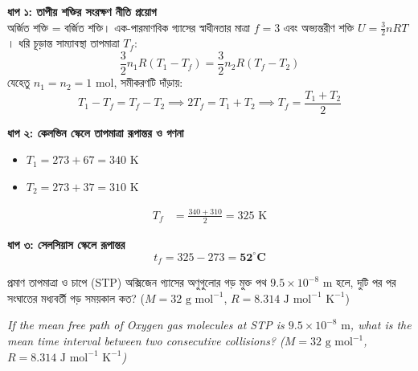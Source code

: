 \documentclass[12pt, a4paper]{article}
\begin{document}
\begin{tcolorbox}[solutionbox={সমাধান (Solution)}]
    \noindent
    \textbf{ধাপ ১: তাপীয় শক্তির সংরক্ষণ নীতি প্রয়োগ} \\
    অর্জিত শক্তি = বর্জিত শক্তি। এক-পারমাণবিক গ্যাসের স্বাধীনতার মাত্রা $f = 3$ এবং অভ্যন্তরীণ শক্তি $U = \frac{3}{2} n R T$। ধরি চূড়ান্ত সাম্যাবস্থা তাপমাত্রা $T_f$:
    \[ \frac{3}{2} n_1 R (T_1 - T_f) = \frac{3}{2} n_2 R (T_f - T_2) \]
    যেহেতু $n_1 = n_2 = 1\text{ mol}$, সমীকরণটি দাঁড়ায়:
    \[ T_1 - T_f = T_f - T_2 \implies 2 T_f = T_1 + T_2 \implies T_f = \frac{T_1 + T_2}{2} \]
    
    \vspace{0.4em}
    \noindent\textbf{ধাপ ২: কেলভিন স্কেলে তাপমাত্রা রূপান্তর ও গণনা}
    \begin{itemize}[leftmargin=1.5em, itemsep=0.2em]
        \item $T_1 = 273 + 67 = 340\text{ K}$
        \item $T_2 = 273 + 37 = 310\text{ K}$
    \end{itemize}
    \begin{align*}
        T_f &= \frac{340 + 310}{2} = 325\text{ K}
    \end{align*}
    
    \vspace{0.4em}
    \noindent\textbf{ধাপ ৩: সেলসিয়াস স্কেলে রূপান্তর}
    \[ t_f = 325 - 273 = \mathbf{52^\circ\text{C}} \]
\end{tcolorbox}

\vspace{2em}

\begin{tcolorbox}[questionbox={প্রশ্ন (Question) 20}]
    \noindent
    প্রমাণ তাপমাত্রা ও চাপে (STP) অক্সিজেন গ্যাসের অণুগুলোর গড় মুক্ত পথ $9.5 \times 10^{-8}\text{ m}$ হলে, দুটি পর পর সংঘাতের মধ্যবর্তী গড় সময়কাল কত? ($M = 32\text{ g mol}^{-1}$, $R = 8.314\text{ J mol}^{-1}\text{ K}^{-1}$)
    
    \vspace{0.8em}
    \begin{english}
    \noindent\textit{\color{darkgray}
    If the mean free path of Oxygen gas molecules at STP is $9.5 \times 10^{-8}\text{ m}$, what is the mean time interval between two consecutive collisions? ($M = 32\text{ g mol}^{-1}$, $R = 8.314\text{ J mol}^{-1}\text{ K}^{-1}$)
    }
    \end{english}
\end{tcolorbox}
\end{document}
